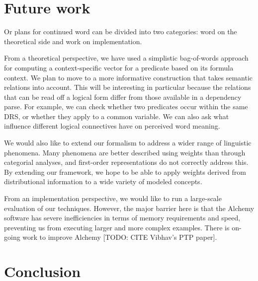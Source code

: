 \section{Future work}
\label{sec:future}

Or plans for continued word can be divided into two categories: word on the
theoretical side and work on implementation.

From a theoretical perspective, we have used a simplistic bag-of-words
approach for
computing a context-specific vector for a predicate based on its
formula context. We plan to move to a more informative construction
that takes semantic relations into account. This will be interesting in particular because the relations that can be read off a logical
form differ from those available in a dependency parse. For example,
we can check whether two predicates occur within the same DRS, or
whether they apply to a common variable. We can also ask what 
influence different logical connectives have on perceived word meaning. 


We would also like to extend our formalism to address
a wider range of linguistic phenomena.  Many phenomena are better
described using weights than through categorial analyses, and first-order representations do not correctly
address this.  By extending our framework, we hope to be able to
apply weights derived from distributional information to a wide variety of
modeled concepts.



From an implementation perspective, we would like to %
run a large-scale
evaluation of our techniques.  
However, the major barrier here is that the Alchemy software has severe
inefficiencies in terms of memory requirements and speed, preventing us
from executing larger and more complex examples.  There is on-going
work to improve Alchemy [TODO: CITE Vibhav's PTP paper].



\section{Conclusion}

